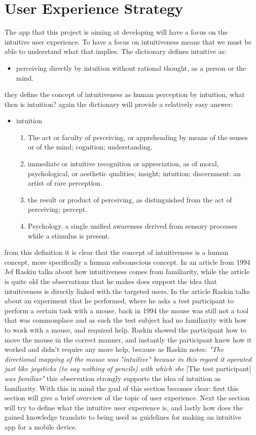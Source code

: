\section{User Experience Strategy}
The app that this project is aiming at developing will have a focus on the intuitive user experience. To have a focus on intuitiveness means that we must be able to understand what that implies. The dictionary defines intuitive as: 
\begin{itemize}
\item perceiving directly by intuition without rational thought, as a person or the mind.
\end{itemize}
they define the concept of intuitiveness as human perception by intuition, what then is intuition? again the dictionary will provide a relatively easy answer: 
\begin{itemize}
\item intuition\\
\begin{enumerate}
\item The act or faculty of perceiving, or apprehending by means of the senses or of the mind; cognition; understanding.
\item immediate or intuitive recognition or appreciation, as of moral, psychological, or aesthetic qualities; insight; intuition; discernment:
an artist of rare perception.
\item the result or product of perceiving, as distinguished from the act of perceiving; percept.
\item Psychology. a single unified awareness derived from sensory processes while a stimulus is present.
\end{enumerate}
\end{itemize} from this definition it is clear that the concept of intuitiveness is a human concept, more specifically a human subconscious concept. In an article from 1994 Jef Raskin\cite{JRaskin} talks about how intuitiveness comes from familiarity, while the article is quite old the observations that he makes does support the idea that intuitiveness is directly linked with the targeted users. In the article Raskin talks about an experiment that he performed, where he asks a test participant to perform a certain task with a mouse, back in 1994 the mouse was still not a tool that was commonplace and as such the test subject had no familiarity with how to work with a mouse, and required help. Raskin showed the participant how to move the mouse in the correct manner, and instantly the participant knew how it worked and didn't require any more help, because as Raskin notes: \textit{"The directional mapping of the mouse was "intuitive" because in this regard it operated just like joysticks (to say nothing of pencils) with which she} [The test participant] \textit{was familiar"}\cite{JRaskin} this observation strongly supports the idea of intuition as familiarity. With this in mind the goal of this section becomes clear: first this section will give a brief overview of the topic of user experience. Next the section will try to define what the intuitive user experience is, and lastly how does the gained knowledge translate to being used as guidelines for making an intuitive app for a mobile device.  

